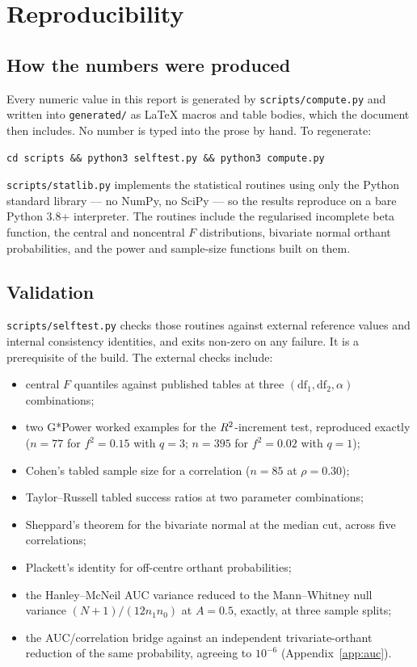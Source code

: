 \section{Reproducibility}
\label{app:repro}

\subsection{How the numbers were produced}

Every numeric value in this report is generated by
\texttt{scripts/compute.py} and written into \texttt{generated/} as \LaTeX{}
macros and table bodies, which the document then includes. No number is typed
into the prose by hand. To regenerate:

\begin{center}
\texttt{cd scripts \&\& python3 selftest.py \&\& python3 compute.py}
\end{center}

\texttt{scripts/statlib.py} implements the statistical routines using only the
Python standard library --- no NumPy, no SciPy --- so the results reproduce on a
bare Python 3.8+ interpreter. The routines include the regularised incomplete
beta function, the central and noncentral $F$ distributions, bivariate normal
orthant probabilities, and the power and sample-size functions built on them.

\subsection{Validation}

\texttt{scripts/selftest.py} checks those routines against external reference
values and internal consistency identities, and exits non-zero on any failure.
It is a prerequisite of the build. The external checks include:

\begin{itemize}[leftmargin=1.4em,itemsep=0.1em]
\item central $F$ quantiles against published tables at three
$(\mathrm{df}_1,\mathrm{df}_2,\alpha)$ combinations;
\item two G*Power worked examples for the $R^{2}$-increment test, reproduced
exactly ($n=77$ for $f^2=0.15$ with $q=3$; $n=395$ for $f^2=0.02$ with $q=1$);
\item Cohen's tabled sample size for a correlation ($n=85$ at $\rho=0.30$);
\item Taylor--Russell tabled success ratios at two parameter combinations;
\item Sheppard's theorem for the bivariate normal at the median cut, across five
correlations;
\item Plackett's identity for off-centre orthant probabilities;
\item the Hanley--McNeil AUC variance reduced to the Mann--Whitney null variance
$(N+1)/(12 n_1 n_0)$ at $A=0.5$, exactly, at three sample splits;
\item the AUC/correlation bridge against an independent trivariate-orthant
reduction of the same probability, agreeing to $10^{-6}$
(Appendix~\ref{app:auc}).
\end{itemize}

